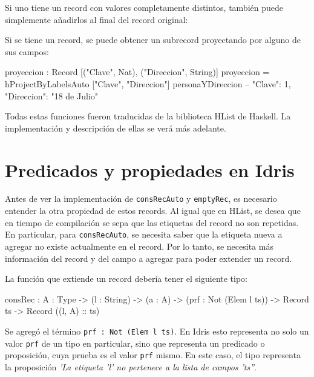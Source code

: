 Si uno tiene un record con valores completamente distintos, también puede simplemente añadirlos al final del record original:


Si se tiene un record, se puede obtener un subrecord proyectando por alguno de sus campos:

\begin{code}
proyeccion : Record [("Clave", Nat), ("Direccion", String)]
proyeccion = hProjectByLabelsAuto ["Clave", "Direccion"]
  personaYDireccion
-- { "Clave": 1, "Direccion": "18 de Julio" }
\end{code}

Todas estas funciones fueron traducidas de la biblioteca HList de Haskell. La implementación y descripción de ellas se verá más adelante.

\section{Predicados y propiedades en Idris}

Antes de ver la implementación de \texttt{consRecAuto} y \texttt{emptyRec}, es necesario entender la otra propiedad de estos records. Al igual que en HList, se desea que en tiempo de compilación se sepa que las etiquetas del record no son repetidas. En particular, para \texttt{consRecAuto}, se necesita saber que la etiqueta nueva a agregar no existe actualmente en el record. Por lo tanto, se necesita más información del record y del campo a agregar para poder extender un record.

La función que extiende un record debería tener el siguiente tipo:

\begin{code}
consRec : {A : Type} -> (l : String) -> (a : A) ->
  (prf : Not (Elem l ts)) -> Record ts -> Record ((l, A) :: ts)
\end{code}

Se agregó el término \texttt{prf : Not (Elem l ts)}. En Idris esto representa no solo un valor \texttt{prf} de un tipo en particular, sino que representa un predicado o proposición, cuya prueba es el valor \texttt{prf} mismo. En este caso, el tipo representa la proposición \textit{'La etiqueta 'l' no pertenece a la lista de campos 'ts''}.


